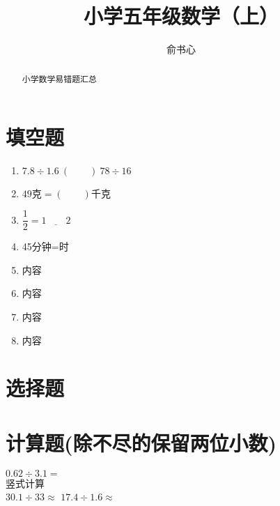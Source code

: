 \documentclass[a4paper,11pt]{article}
\title{小学五年级数学（上） }
\author{俞书心}
\begin{document}
\begin{CJK}{UTF8}{gkai}
\maketitle
\tableofcontents

\begin{abstract}
小学数学易错题汇总
\end{abstract}

\newpage
\section{填空题}

\makeatletter 
\def\zdyxh#1{\expandafter\@zdyxh\csname c@#1\endcsname} 
\def\@zdyxh#1{%
\ifcase#1\or 1\or 2\or 3\or 4\or 5\or 6\or 7\or 8\or 9\or 10\or 11\or 12\or 13\or 14\or 15\or 5\else 超了\fi} 
\makeatother 
{} 
\begin{enumerate}[label=\zdyxh*.] 
\item \begin{math}
 7.8\div1.6\ (\qquad  )\ 78 \div16 
 \end{math}
\item $49\mbox{克}= (\qquad )\mbox{千克}$
\item $\dfrac{1}{2}=1\underline{\qquad     }2$
\item 45分钟=\underline{\qquad     }时
\item 内容 
\item 内容 
\item 内容 
\item 内容 

\end{enumerate}

\section{选择题}

 \section{计算题(除不尽的保留两位小数)}
 $0.62\div3.1=$ \\
竖式计算\\
$30.1\div 33\approx $ \qquad $17.4\div1.6\approx$
\\ \\ \\ \\ \\ 





\end{CJK}
\end{document}
